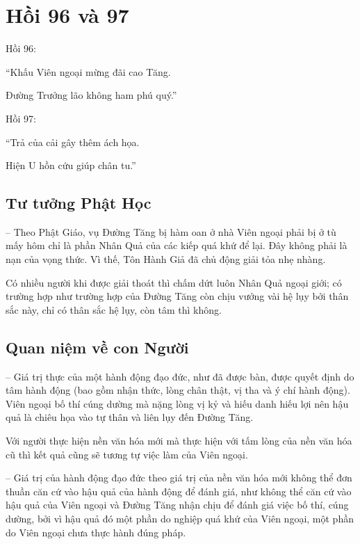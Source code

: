 \chapter{Hồi 96 và 97} %
\label{cha:hoi_96_97}

Hồi 96:

\begin{itshape}
``Khấu Viên ngoại mừng đãi cao Tăng.

Đường Trưởng lão không ham phú quý.''
\end{itshape}

Hồi 97:

\begin{itshape}
``Trả của cải gây thêm ách họa.

Hiện U hồn cứu giúp chân tu.''
\end{itshape}

\section{Tư tưởng Phật Học} %
\label{sec:96_97_phat_hoc}

-- Theo Phật Giáo, vụ Đường Tăng bị hàm oan ở nhà Viên ngoại phải bị ở tù mấy hôm chỉ là phần Nhân Quả của các kiếp quá khứ để lại. Đây không phải là nạn của vọng thức. Vì thế, Tôn Hành Giả đã chủ động giải tỏa nhẹ nhàng.

Có nhiều người khi được giải thoát thì chấm dứt luôn Nhân Quả ngoại giới; có trường hợp như trường hợp của Đường Tăng còn chịu vướng vài hệ lụy bởi thân sắc này, chỉ có thân sắc hệ lụy, còn tâm thì không.

\section{Quan niệm về con Người} %
\label{sec:96_97_con_nguoi}

-- Giá trị thực của một hành động đạo đức, như đã được bàn, được quyết định do tâm hành động (bao gồm nhận thức, lòng chân thật, vị tha và ý chí hành động). Viên ngoại bố thí cúng dường mà nặng lòng vị kỷ và hiếu danh hiếu lợi nên hậu quả là chiêu họa vào tự thân và liên lụy đến Đường Tăng.

Với người thực hiện nền văn hóa mới mà thực hiện với tấm lòng của nền văn hóa cũ thì kết quả cũng sẽ tương tự việc làm của Viên ngoại.

-- Giá trị của hành động đạo đức theo giá trị của nền văn hóa mới không thể đơn thuần căn cứ vào hậu quả của hành động để đánh giá, như không thể căn cứ vào hậu quả của Viên ngoại và Đường Tăng nhận chịu để đánh giá việc bố thí, cúng dường, bởi vì hậu quả đó một phần do nghiệp quá khứ của Viên ngoại, một phần do Viên ngoại chưa thực hành đúng pháp.

